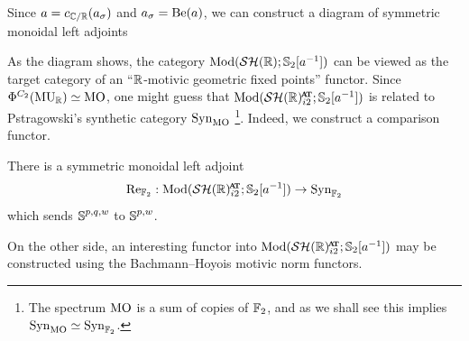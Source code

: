 Since $a = c_{\mathbb{C}/\mathbb{R}}(a_\sigma)$ and $a_\sigma = \mathrm{Be} (a) $, we can construct a diagram of symmetric monoidal left adjoints
\begin{center}  \end{center}
As the diagram shows, the category $\mathrm{Mod}(\mathcal{SH}(\mathbb{R}); \operatorname{\mathbb{S}}_2 [a^{-1}])$ can be viewed as the target category of an ``$\mathbb{R}$-motivic geometric fixed points'' functor.
Since $\Phi^{C_2} (\operatorname{\mathrm{MU}}_{\mathbb{R}}) \simeq \operatorname{\mathrm{MO}}$, one might guess that $\Mod(\SHRat; \Ss_2 [a^{-1}])$ is related to Pstragowski's synthetic category $\mathrm{Syn}_{\operatorname{\mathrm{MO}}}$ \footnote{The spectrum $\operatorname{\mathrm{MO}}$ is a sum of copies of $\operatorname{\mathbb{F}}_2$, and as we shall see this implies $\mathrm{Syn}_{\operatorname{\mathrm{MO}}} \simeq \mathrm{Syn}_{\operatorname{\mathbb{F}}_2}$.}. Indeed, we construct a comparison functor.

\begin{prop}
  There is a symmetric monoidal left adjoint
  \[\Re_{\F_2} : \Mod(\SHRat; \Ss_2 [a^{-1}]) \to \Syn_{\F_2}\]
  which sends $\operatorname{\mathbb{S}}^{p,q,w}$ to $\operatorname{\mathbb{S}}^{p,w}$.
\end{prop}

On the other side, an interesting functor into $\Mod(\SHRat; \Ss_2 [a^{-1}])$ may be constructed using the Bachmann--Hoyois motivic norm functors.

